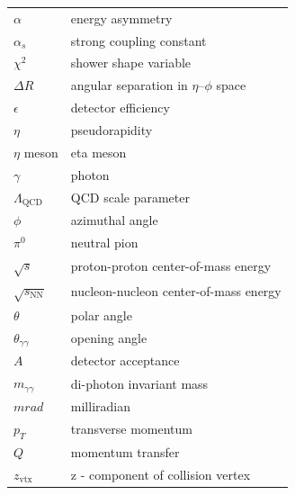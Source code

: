 \begin{tabular}{@{}ll@{}}
$\alpha$ &energy asymmetry\\
$\alpha_s$   & strong coupling constant\\
$\chi^2$   & shower shape variable \\
$\Delta R$   & angular separation in $\eta$--$\phi$ space\\
$\epsilon$   & detector efficiency\\
$\eta$   & pseudorapidity\\
$\eta$ meson   & eta meson\\
$\gamma$   & photon\\
$\Lambda_{\mathrm{QCD}}$   & QCD scale parameter\\
$\phi$   & azimuthal angle\\
$\pi^0$   & neutral pion\\
$\sqrt{s}$   & proton-proton center-of-mass energy\\
$\sqrt{s_{\mathrm{NN}}}$   & nucleon-nucleon center-of-mass energy\\
$\theta$   & polar angle\\
$\theta_{\gamma\gamma}$   & opening angle\\
$A$   & detector acceptance\\
$m_{\gamma\gamma}$   & di-photon invariant mass\\
$mrad$   & milliradian\\
$p_T$   & transverse momentum\\
$Q$   & momentum transfer\\
$z_{\mathrm{vtx}}$   & z - component of collision vertex\\
\end{tabular}
